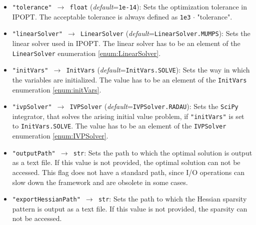 \documentclass[12pt]{article}
\begin{document}
\begin{mdframed}[backgroundcolor=gray!10, roundcorner=10pt,
		linewidth=1pt]

	\begin{itemize}

		\label{flag:tolerance}
		\item \texttt{"tolerance" $\rightarrow$ float}
		      (\emph{default}=\texttt{1e-14}): Sets the optimization tolerance in IPOPT. The
		      acceptable tolerance is always defined as \texttt{1e3} $\cdot$ "tolerance".

		      \label{flag:linearSolver}
		\item \texttt{"linearSolver" $\rightarrow$ LinearSolver}
		      (\emph{default}=\texttt{LinearSolver.MUMPS}): Sets the linear solver used in
		      IPOPT. The linear solver has to be an element of the \texttt{LinearSolver}
		      enumeration \eqref{enum:LinearSolver}.

		      \label{flag:initVars}
		\item \texttt{"initVars" $\rightarrow$ InitVars}
		      (\emph{default}=\texttt{InitVars.SOLVE}): Sets the way in which the variables
		      are initialized. The value has to be an element of the \texttt{InitVars}
		      enumeration \eqref{enum:initVars}.

		      \label{flag:ivpSolver}
		\item \texttt{"ivpSolver" $\rightarrow$ IVPSolver}
		      (\emph{default}=\texttt{IVPSolver.RADAU}): Sets the \texttt{SciPy} integrator,
		      that solves the arising initial value problem, if \texttt{"initVars"} is set to
		      \texttt{InitVars.SOLVE}. The value has to be an element of the
		      \texttt{IVPSolver} enumeration \eqref{enum:IVPSolver}.

		      \label{flag:outputPath}
		\item \texttt{"outputPath" $\rightarrow$ str}: Sets the path to which
		      the optimal solution is output as a text file. If this value is not provided,
		      the optimal solution can not be accessed. This flag does not have a standard
		      path, since I/O operations can slow down the framework and are obsolete in some
		      cases.

		      \label{flag:exportHessianPath}
		\item \texttt{"exportHessianPath" $\rightarrow$ str}: Sets the path to
		      which the Hessian sparsity pattern is output as a text file. If this value is
		      not provided, the sparsity can not be accessed.


\end{itemize}
\end{mdframed}
\end{document}
